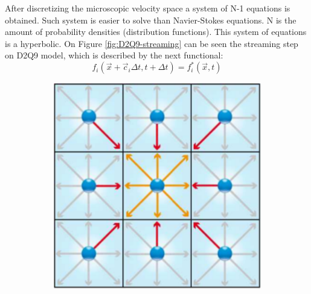 After discretizing the microscopic velocity space a system of N-1 equations is obtained. Such system is easier to solve than Navier-Stokes equations. N is the amount of probability densities (distribution functions). This system of equations is a hyperbolic. On Figure \ref{fig:D2Q9-streaming} can be seen the streaming step on D2Q9 model, which is described by the next functional:
\begin{equation}
f_i(\vec{x}+\vec{c}_{i}\Delta t, t+\Delta t) = f_i^{*}(\vec{x}, t)
\end{equation}

\begin{figure}[H]
  \centering
  \begin{subfigure}[h]{0.3\textwidth}
    \includegraphics[width=\textwidth]{img/fig7-1.png}
  \end{subfigure}
  \begin{subfigure}[h]{0.3\textwidth}

\end{subfigure}
\end{figure}
